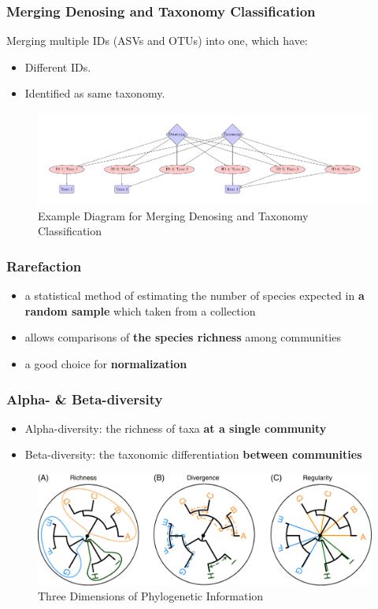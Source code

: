 \documentclass{beamer}
\begin{document}
    \begin{frame}
        \frametitle{Merging Denosing and Taxonomy Classification}

        Merging multiple IDs (ASVs and OTUs) into one, which have:
        \begin{itemize}
            \item Different IDs.
            \item Identified as same taxonomy.
        \end{itemize}

        \begin{figure}
            \includegraphics[width=0.6 \linewidth]{figures/Merging/merging.pdf}
            \caption{Example Diagram for Merging Denosing and Taxonomy Classification}
        \end{figure}
    \end{frame}

    \begin{frame}
        \frametitle{Rarefaction}

        \begin{itemize}
            \item a statistical method of estimating the number of species expected in \textbf{a random sample} which taken from a collection \cite{rarefaction1}
            \item allows comparisons of \textbf{the species richness} among communities
            \item a good choice for \textbf{normalization} \cite{rarefaction2}
        \end{itemize}
    \end{frame}

    \begin{frame}
        \frametitle{Alpha- \& Beta-diversity}

        \begin{itemize}
            \item Alpha-diversity: the richness of taxa \textbf{at a single community}
            \item Beta-diversity: the taxonomic differentiation \textbf{between communities}
        \end{itemize}

        \begin{figure}[p]
            \includegraphics[width=0.7 \linewidth]{figures/phylogenetic-info.jpg}
            \caption{Three Dimensions of Phylogenetic Information \protect\cite{phylogenetic1}}
        \end{figure}
   \end{frame}
\end{document}
